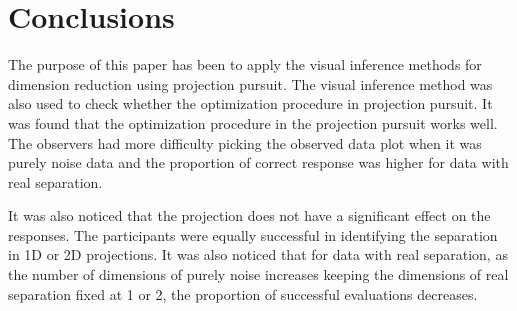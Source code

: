 \documentclass[12]{article}
\begin{document}
%
% 
%
%

\section{Conclusions}
The purpose of this paper has been to apply the visual inference methods for dimension reduction using projection pursuit. The visual inference method was also used to check whether the optimization procedure in projection pursuit. It was found that the optimization procedure in the projection pursuit works well. The observers had more difficulty picking the observed data plot when it was purely noise data and the proportion of correct response was higher for data with real separation. 

It was also noticed that the projection does not have a significant effect on the responses. The participants were equally successful in identifying the separation in 1D or 2D projections. It was also noticed that for data with real separation, as the number of dimensions of purely noise increases keeping the dimensions of real separation fixed at 1 or 2, the proportion of successful evaluations decreases. 
\end{document}
